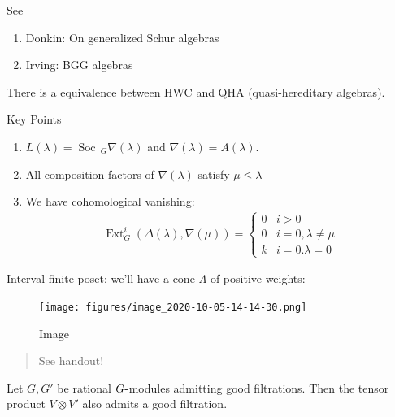 See

\begin{enumerate}
\def\labelenumi{\arabic{enumi}.}
\item
  Donkin: On generalized Schur algebras
\item
  Irving: BGG algebras
\end{enumerate}

There is a equivalence between HWC and QHA (quasi-hereditary algebras).

\begin{remark}

\begin{remark}

Key Points

\begin{enumerate}
\def\labelenumi{\arabic{enumi}.}
\item
  \(L(\lambda) = \operatorname{Soc}\,_G \nabla(\lambda)\) and
  \(\nabla(\lambda) = A(\lambda)\).
\item
  All composition factors of \(\nabla(\lambda)\) satisfy
  \(\mu \leq \lambda\)
\item
  We have cohomological vanishing:
  \begin{align*}     \operatorname{Ext}_G^i(\Delta(\lambda), \nabla(\mu)) =      \begin{cases}     0 & i >0 \\     0 & i=0, \lambda \neq \mu \\     k & i=0. \lambda = 0     \end{cases}     \end{align*}
\end{enumerate}

\end{remark}

\end{remark}

Interval finite poset: we'll have a cone \(\Lambda\) of positive
weights:

\begin{figure}
\centering
\texttt{[image: figures/image\_2020-10-05-14-14-30.png]}
\caption{Image}
\end{figure}

\begin{quote}
See handout!
\end{quote}

\begin{theorem}[?]

\begin{theorem}[?]

Let \(G ,G'\) be rational \(G{\hbox{-}}\)modules admitting good
filtrations. Then the tensor product \(V\otimes V'\) also admits a good
filtration.

\end{theorem}

\end{theorem}

